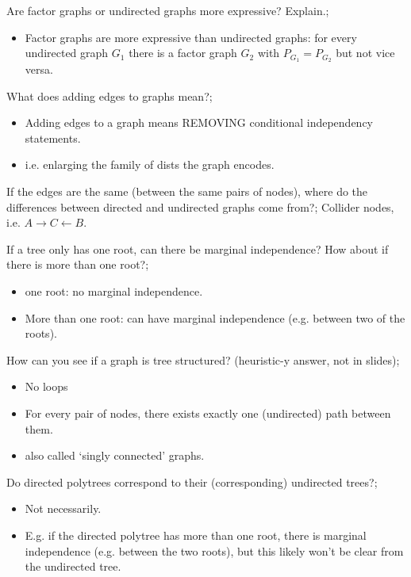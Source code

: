 \documentclass{article}
\begin{document}

Are factor graphs or undirected graphs more expressive? Explain.; \begin{itemize} \item Factor graphs are more expressive than undirected graphs: for every undirected graph $G_1$ there is a factor graph $G_2$ with $P_{G_1}=P_{G_2}$ but not vice versa.  \end{itemize} 

What does adding edges to graphs mean?; \begin{itemize} \item Adding edges to a graph means REMOVING conditional independency statements.  \item i.e. enlarging the family of dists the graph encodes.  \end{itemize}

If the edges are the same (between the same pairs of nodes), where do the differences between directed and undirected graphs come from?; Collider nodes, i.e. $A\rightarrow C \leftarrow B$.

If a tree only has one root, can there be marginal independence? How about if there is more than one root?; \begin{itemize} \item one root: no marginal independence.  \item More than one root: can have marginal independence (e.g. between two of the roots).  \end{itemize}

How can you see if a graph is tree structured? (heuristic-y answer, not in slides); \begin{itemize} \item No loops \item For every pair of nodes, there exists exactly one (undirected) path between them.  \item also called `singly connected' graphs.  \end{itemize}

Do directed polytrees correspond to their (corresponding) undirected trees?; \begin{itemize} \item Not necessarily.  \item E.g. if the directed polytree has more than one root, there is marginal independence (e.g. between the two roots), but this likely won't be clear from the undirected tree.  \end{itemize}
\end{document}
